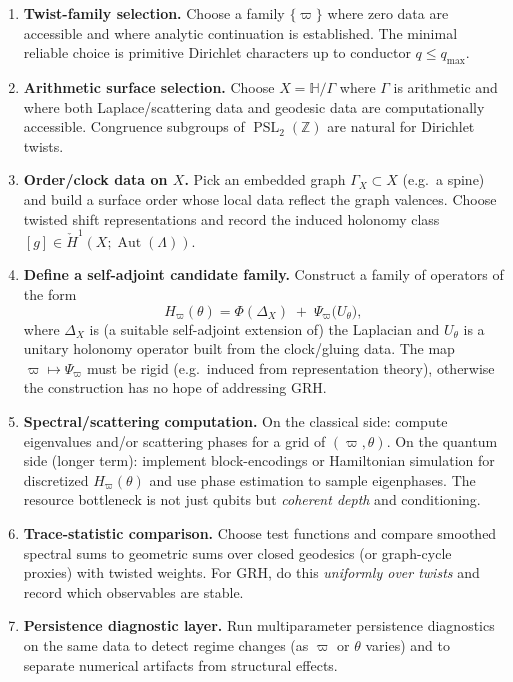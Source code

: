 \documentclass[11pt,oneside]{amsbook}
\numberwithin{equation}{section}
\theoremstyle{plain}
\theoremstyle{definition}
\theoremstyle{remark}
\newcommand{\HH}{\mathbb{H}}
\newcommand{\Z}{\mathbb{Z}}
\DeclareMathOperator{\Aut}{\mathrm{Aut}}
\DeclareMathOperator{\PSL}{\mathrm{PSL}}
\begin{document}
\begin{enumerate}
\item \textbf{Twist-family selection.}
Choose a family $\{\varpi\}$ where zero data are accessible and where analytic continuation is established.
The minimal reliable choice is primitive Dirichlet characters up to conductor $q\le q_{\max}$.

\item \textbf{Arithmetic surface selection.}
Choose $X=\HH/\Gamma$ where $\Gamma$ is arithmetic and where both Laplace/scattering data and geodesic data are computationally accessible.
Congruence subgroups of $\PSL_2(\Z)$ are natural for Dirichlet twists.

\item \textbf{Order/clock data on $X$.}
Pick an embedded graph $\Gamma_X\subset X$ (e.g.\ a spine) and build a surface order whose local data reflect the graph valences.
Choose twisted shift representations and record the induced holonomy class $[g]\in \check{H}^1(X;\Aut(\Lambda))$.

\item \textbf{Define a self-adjoint candidate family.}
Construct a family of operators of the form
\[
H_\varpi(\theta)=\Phi(\Delta_X)\;+\;\Psi_\varpi\!\big(U_\theta\big),
\]
where $\Delta_X$ is (a suitable self-adjoint extension of) the Laplacian and $U_\theta$ is a unitary holonomy operator built from the clock/gluing data.
The map $\varpi\mapsto \Psi_\varpi$ must be rigid (e.g.\ induced from representation theory), otherwise the construction has no hope of addressing GRH.

\item \textbf{Spectral/scattering computation.}
On the classical side: compute eigenvalues and/or scattering phases for a grid of $(\varpi,\theta)$.
On the quantum side (longer term): implement block-encodings or Hamiltonian simulation for discretized $H_\varpi(\theta)$ and use phase estimation to sample eigenphases.
The resource bottleneck is not just qubits but \emph{coherent depth} and conditioning.

\item \textbf{Trace-statistic comparison.}
Choose test functions and compare smoothed spectral sums to geometric sums over closed geodesics (or graph-cycle proxies) with twisted weights.
For GRH, do this \emph{uniformly over twists} and record which observables are stable.

\item \textbf{Persistence diagnostic layer.}
Run multiparameter persistence diagnostics on the same data to detect regime changes (as $\varpi$ or $\theta$ varies) and to separate numerical artifacts from structural effects.
\end{enumerate}
\end{document}
